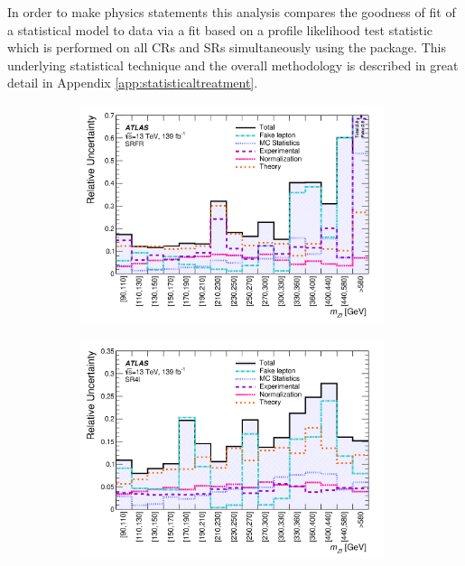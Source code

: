 In order to make physics statements this analysis compares the goodness of fit of a statistical model to data via a fit based on a profile likelihood test statistic which is performed on all CRs and SRs simultaneously using the \Histfitter package.
This underlying statistical technique and the overall methodology is described in great detail in Appendix \ref{app:statisticaltreatment}.
\begin{figure}[h]
    \centering
    \begin{subfigure}[b]{0.49\textwidth}
      \centering
      \includegraphics[width=0.98\textwidth]{figs/rpvthreel/systsflat_dist_SRTL.png}
      \caption{}
      \label{fig:systSRFR}
    \end{subfigure}
    \hfill
    \begin{subfigure}[b]{0.49\textwidth}
      \centering
      \includegraphics[width=0.98\textwidth]{figs/rpvthreel/systsflat_dist_SROL4l.png}

\end{subfigure}
\end{figure}
